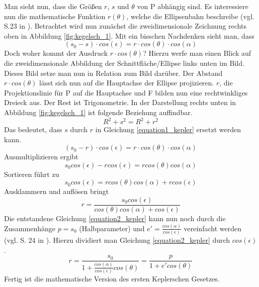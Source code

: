 \newpar
Man sieht nun, dass die Größen \ensuremath{r}, \ensuremath{s} und \ensuremath{\theta} von P abhängig sind. Es interessiere nun die mathematische Funktion \ensuremath{r(\theta)}, welche die Ellipsenbahn beschreibe (vgl. S.23 in \cite{Raumflugm}). Betrachtet wird nun zunächst die zweidimensionale Zeichnung rechts oben in Abbildung \ref{fig:kegelsch_1}. Mit ein bisschen Nachdenken sieht man, dass
\begin{equation}
	(s_0-s) \cdot cos(\epsilon) = r \cdot cos (\theta) \cdot cos(\alpha)
	\label{equation1_kepler}
\end{equation} 
Doch woher kommt der Ausdruck \ensuremath{r \cdot cos(\theta)}? Hierzu werfe man einen Blick auf die zweidimensionale Abbildung der Schnittfläche/Ellipse links unten im Bild. Dieses Bild setze man nun in Relation zum Bild darüber. Der Abstand \ensuremath{r \cdot cos(\theta)} lässt sich nun auf die Hauptachse der Ellipse projizieren. \ensuremath{r}, die Projektionslinie für P auf die Hauptachse und F bilden nun eine rechtwinkliges Dreieck aus. Der Rest ist Trigonometrie. 
\newpar
In der Darstellung rechts unten in Abbildung \ref{fig:kegelsch_1} ist folgende Beziehung auffindbar. 
\begin{equation}
 R^2 + s^2 = R^2 + r^2
\end{equation} 
Das bedeutet, dass \ensuremath{s} durch \ensuremath{r} in Gleichung \ref{equation1_kepler} ersetzt werden kann. 
\begin{equation}
	(s_0-r) \cdot cos(\epsilon) = r \cdot cos (\theta) \cdot cos(\alpha)
\end{equation}
Ausmultiplizieren ergibt
\begin{equation}
s_0 cos(\epsilon) - r cos(\epsilon) = r cos (\theta) cos(\alpha)
\end{equation}
Sortieren führt zu 
\begin{equation}
s_0 cos(\epsilon) = r cos (\theta) cos(\alpha) + r cos(\epsilon)
\end{equation}
Ausklammern und auflösen bringt
\begin{equation}
	r = \frac{s_0 cos(\epsilon) }{cos (\theta) cos(\alpha) + cos(\epsilon)}
		\label{equation2_kepler}
\end{equation}
Die entstandene Gleichung \ref{equation2_kepler} kann nun noch durch die Zusammenhänge \ensuremath{p=s_0} (Halbparameter) und \ensuremath{e'=\frac{cos(\alpha)}{cos(\epsilon)}} vereinfacht werden (vgl. S. 24 in \cite{Raumflugm}). Hierzu dividiert man Gleichung \ref{equation2_kepler} durch \ensuremath{cos(\epsilon)}. 
\begin{equation}
r = \frac{s_0}{1+\frac{cos(\alpha)}{cos(\epsilon)}cos (\theta)} = \frac{p}{1 + e' cos(\theta)} 
\label{equation3_kepler}
\end{equation}
Fertig ist die mathematische Version des ersten Keplerschen Gesetzes. 

